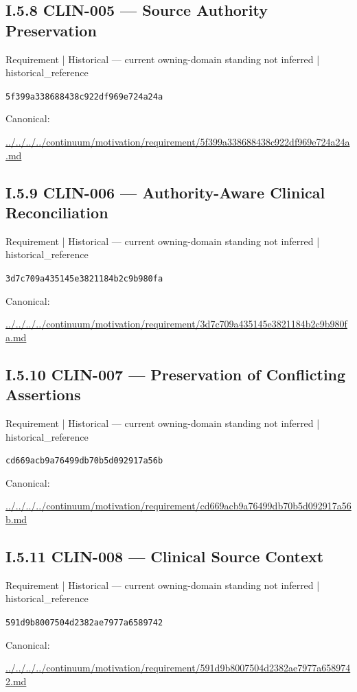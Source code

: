 \documentclass[10pt,a4paper]{article}
\begin{document}
\subsection*{I.5.8 CLIN-005 — Source Authority Preservation}
\label{element-5f399a338688438c922df969e724a24a}
{\small Requirement | Historical — current owning-domain standing not inferred | historical\_reference}\par
\texttt{5f399a338688438c922df969e724a24a}\par
Canonical: \par
{\footnotesize\url{../../../../continuum/motivation/requirement/5f399a338688438c922df969e724a24a.md}}\par
\subsection*{I.5.9 CLIN-006 — Authority-Aware Clinical Reconciliation}
\label{element-3d7c709a435145e3821184b2c9b980fa}
{\small Requirement | Historical — current owning-domain standing not inferred | historical\_reference}\par
\texttt{3d7c709a435145e3821184b2c9b980fa}\par
Canonical: \par
{\footnotesize\url{../../../../continuum/motivation/requirement/3d7c709a435145e3821184b2c9b980fa.md}}\par
\subsection*{I.5.10 CLIN-007 — Preservation of Conflicting Assertions}
\label{element-cd669acb9a76499db70b5d092917a56b}
{\small Requirement | Historical — current owning-domain standing not inferred | historical\_reference}\par
\texttt{cd669acb9a76499db70b5d092917a56b}\par
Canonical: \par
{\footnotesize\url{../../../../continuum/motivation/requirement/cd669acb9a76499db70b5d092917a56b.md}}\par
\subsection*{I.5.11 CLIN-008 — Clinical Source Context}
\label{element-591d9b8007504d2382ae7977a6589742}
{\small Requirement | Historical — current owning-domain standing not inferred | historical\_reference}\par
\texttt{591d9b8007504d2382ae7977a6589742}\par
Canonical: \par
{\footnotesize\url{../../../../continuum/motivation/requirement/591d9b8007504d2382ae7977a6589742.md}}\par
\end{document}
